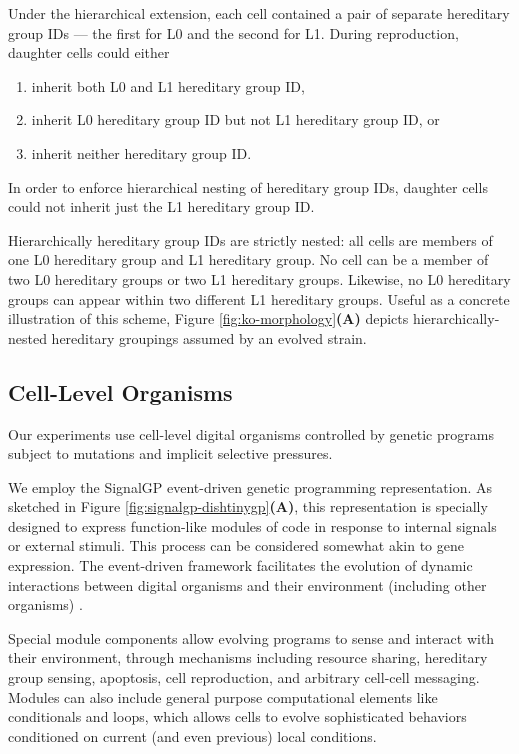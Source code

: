 Under the hierarchical extension, each cell contained a pair of separate hereditary group IDs --- the first for L0 and the second for L1.
During reproduction, daughter cells could either
\begin{enumerate}
\item inherit both L0 and L1 hereditary group ID,
\item inherit L0 hereditary group ID but not L1 hereditary group ID, or
\item inherit neither hereditary group ID.
\end{enumerate}
In order to enforce hierarchical nesting of hereditary group IDs, daughter cells could not inherit just the L1 hereditary group ID.

Hierarchically hereditary group IDs are strictly nested: all cells are members of one L0 hereditary group and L1 hereditary group.
No cell can be a member of two L0 hereditary groups or two L1 hereditary groups.
Likewise, no L0 hereditary groups can appear within two different L1 hereditary groups.
Useful as a concrete illustration of this scheme, Figure \ref{fig:ko-morphology}\textbf{(A)} depicts hierarchically-nested hereditary groupings assumed by an evolved strain.

\subsection{Cell-Level Organisms}

Our experiments use cell-level digital organisms controlled by genetic programs subject to mutations and implicit selective pressures.

We employ the SignalGP event-driven genetic programming representation.
As sketched in Figure \ref{fig:signalgp-dishtinygp}\textbf{(A)}, this representation is specially designed to express function-like modules of code in response to internal signals or external stimuli.
This process can be considered somewhat akin to gene expression.
The event-driven framework facilitates the evolution of dynamic interactions between digital organisms and their environment (including other organisms) \citep{lalejini2018evolving}.

Special module components allow evolving programs to sense and interact with their environment, through mechanisms including resource sharing, hereditary group sensing, apoptosis, cell reproduction, and arbitrary cell-cell messaging.
Modules can also include general purpose computational elements like conditionals and loops, which allows cells to evolve sophisticated behaviors conditioned on current (and even previous) local conditions.

